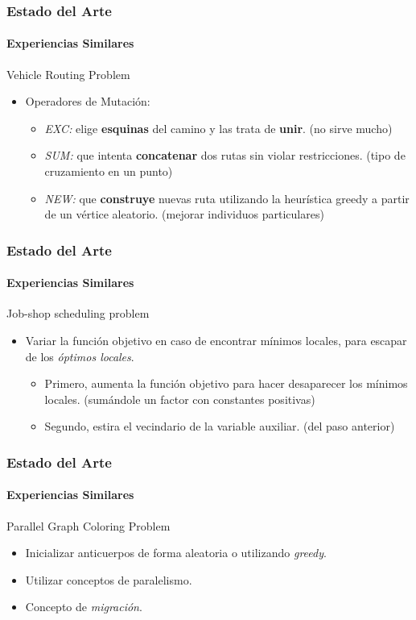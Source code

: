 \frame
{
\frametitle{Estado del Arte}
\framesubtitle{Experiencias Similares}
\begin{block}{Vehicle Routing Problem}
\begin{itemize}
    \item Operadores de Mutación:
    \begin{itemize}
        \item \emph{EXC:}
            elige \textbf{esquinas} del camino y las trata de \textbf{unir}. (no sirve mucho)
        \item \emph{SUM:}
            que intenta \textbf{concatenar} dos rutas sin violar restricciones. (tipo de cruzamiento en un punto)
        \item \emph{NEW:}
            que \textbf{construye} nuevas ruta utilizando la heurística greedy a partir de un vértice aleatorio. (mejorar individuos particulares)
    \end{itemize}
\end{itemize}
\end{block}
}

\frame
{
\frametitle{Estado del Arte}
\framesubtitle{Experiencias Similares}
\begin{block}{Job-shop scheduling problem}
\begin{itemize}
    \item Variar la función objetivo en caso de encontrar mínimos locales, para escapar de los \emph{óptimos locales}.
    \begin{itemize}
        \item Primero, aumenta la función objetivo para hacer desaparecer los mínimos locales. (sumándole un factor con constantes positivas)
        \item Segundo, estira el vecindario de la variable auxiliar. (del paso anterior)
    \end{itemize}
\end{itemize}
\end{block}
}

\frame
{
\frametitle{Estado del Arte}
\framesubtitle{Experiencias Similares}
\begin{block}{Parallel Graph Coloring Problem}
\begin{itemize}
    \item Inicializar anticuerpos de forma aleatoria o utilizando \emph{greedy}.
    \item Utilizar conceptos de paralelismo.
    \item Concepto de \emph{migración}.
\end{itemize}
\end{block}
}

